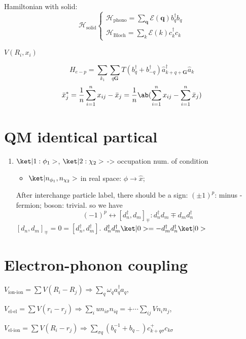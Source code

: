Hamiltonian with solid:
\begin{equation}
  \mathcal H_\text{solid}
  \begin{cases}
    \mathcal H_\text{phono} = \sum_{\bm q} \mathcal E(\bm q) b_q^\dagger b_q\\
    \mathcal H_\text{Bloch} = \sum_k \mathcal E(k) c_k^\dagger c_k
  \end{cases}
\end{equation}

$V(R_i,x_i)$

\begin{equation}
  H_{e-p} = \sum_{k_1} \sum_{q \bm G} T (b_q^\dagger + b_{-q}^\dagger) \hat a_{k+q+\bm G}^\dagger \hat a_k
\end{equation}
\[
  \bar x_j^* = \frac1n \sum_{i=1}^n x_{ij} - \bar x_j
= \frac1n \ab(\sum_{i=1}^n x_{ij} - \sum_{i=1}^n \bar x_j)
\]

\section{QM identical partical}

\begin{enumerate}
  \item $\ket|1:\phi_1>$, $\ket|2:\chi_2>$ -> occupation num. of condition
  \begin{itemize}
    \item $\ket|n_{\phi_1}, n_{\chi_2}>$
    in real space: $\phi \to \hat x$;
  \end{itemize}
  After interchange particle label, there should be a sign: $(\pm 1)^p$: minus - fermion; boson: trivial.
  so we have
  \[
    (-1)^p \leftrightarrow [d_n^\dagger, d_m]_\mp:
    d_n^\dagger d_m \mp d_m d_n^\dagger
  \]
  $[d_n, d_m]_\mp = 0 = [d_n^\dagger, d_m^\dagger]$.
  $d_n^\dagger d_m^\dagger \ket|0> = -d_m^\dagger d_n^\dagger \ket|0>$
\end{enumerate}

\section{Electron-phonon coupling}

$V_\text{ion-ion} = \sum V(R_i - R_j) \Rightarrow \sum_q \omega_q a_q^\dagger a_q$,

$V_\text{el-el} = \sum V(r_i - r_j) \Rightarrow \sum_i u n_{i\sigma} n_{iq} = + \cdots \sum_{ij} V n_i n_j$,

$V_\text{el-ion} = \sum V(R_i - r_j) \Rightarrow \sum_{\sigma q} (b_q^{-1} + b_{q-}) c_{k+q\sigma}^+ c_{k\sigma}$

